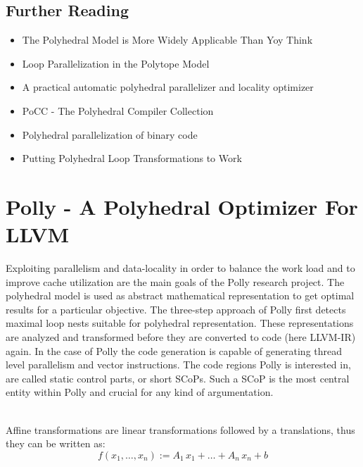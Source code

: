 \subsection*{Further Reading}
\begin{itemize}
  \item The Polyhedral Model is More Widely Applicable Than Yoy Think \cite{BPCB10}
  \item Loop Parallelization in the Polytope Model \cite{Lengauer93loopparallelization}  
  \item A practical automatic polyhedral parallelizer and locality optimizer \cite{Bondhugula:2008:PAP:1379022.1375595}
  \item PoCC - The Polyhedral Compiler Collection \cite{PoCC:Online}
  \item Polyhedral parallelization of binary code \cite{Pradelle:2012:PPB:2086696.2086718}
  \item Putting Polyhedral Loop Transformations to Work \cite{BCGST03} 
\end{itemize}


\section{Polly - A Polyhedral Optimizer For LLVM}
\label{Polly}
Exploiting parallelism and data-locality in order to balance the work load
and to improve cache utilization are the main goals of the Polly research project.
The polyhedral model is used as abstract mathematical representation to get optimal
results for a particular objective. The three-step approach of Polly first detects
maximal loop nests suitable for polyhedral representation. These representations
are analyzed and transformed before they are converted to code (here LLVM-IR)
again. In the case of Polly the code generation is capable of generating thread 
level parallelism and vector instructions. The code regions Polly is interested 
in, are called static control parts, or short SCoPs. Such a SCoP is 
the most central entity within Polly and crucial for any kind of argumentation.

\begin{definition} ~\\
  Affine transformations are linear transformations followed by a translations,
  thus they can be written as:
  \[ f(x_1,\dots,x_n) := A_1\, x_1 + \dots + A_n\, x_n + b\]

  \label{def:AffineTransformation}
\end{definition}

